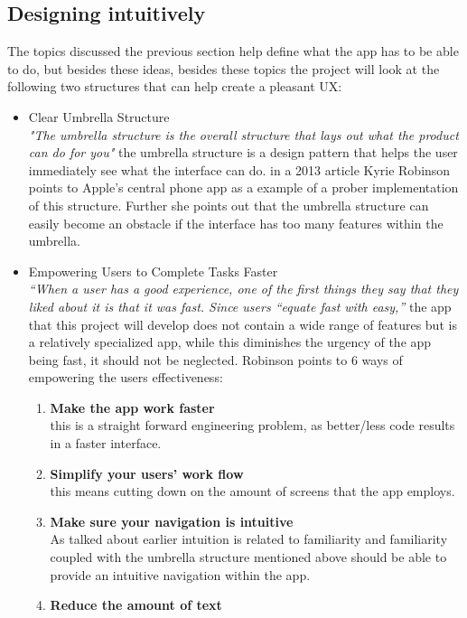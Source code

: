 \subsection{ Designing intuitively  }
The topics discussed the previous section help define what the app has to be able to do, but besides these ideas, besides these topics the project will look at the following two structures that can help create a pleasant UX:
\begin{itemize}
\item Clear Umbrella Structure\\
\textit{"The umbrella structure is the overall structure that lays out what the product can do for you"}\cite{UXKeys} the umbrella structure is a design pattern that helps the user immediately see what the interface can do. in a 2013 article Kyrie Robinson points to Apple's central phone app as a example of a prober implementation of this structure. Further she points out that the umbrella structure can easily become an obstacle if the interface has too many features within the umbrella. 
\item  Empowering Users to Complete Tasks Faster\\
 \textit{“When a user has a good experience, one of the first things they say that they liked about it is that it was fast. Since users “equate fast with easy,” }\cite{UXKeys} the app that this project will develop does not contain a wide range of features but is a relatively specialized app, while this diminishes the urgency of the app being fast, it should not be neglected. Robinson points to 6 ways of empowering the users effectiveness:
 \begin{enumerate}
 \item \textbf{Make the app work faster}\\
 this is a straight forward engineering problem, as better/less code results in a faster interface. 
 \item \textbf{Simplify your users’ work flow}\\
  this means cutting down on the amount of screens that the app employs.
 \item \textbf{Make sure your navigation is intuitive}\\\label{effectivenessP3}
 As talked about earlier intuition is related to familiarity and familiarity coupled with the umbrella structure mentioned above should be able to provide an intuitive navigation within the app.
 \item \textbf{Reduce the amount of text}\\

\end{enumerate}
\end{itemize}
